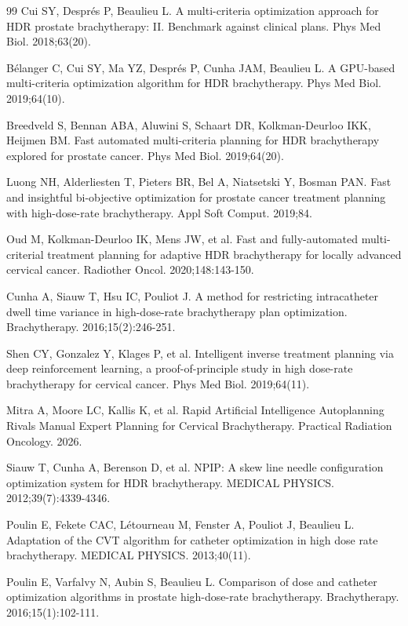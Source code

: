 \documentclass[12pt,twoside,letterpaper]{article}
\newcounter{algorithm}
\begin{document}
\begin{thebibliography}{99}
 Cui SY, Després P, Beaulieu L. A multi-criteria optimization approach for HDR prostate brachytherapy: II. Benchmark against clinical plans. Phys Med Biol. 2018;63(20).

 Bélanger C, Cui SY, Ma YZ, Després P, Cunha JAM, Beaulieu L. A GPU-based multi-criteria optimization algorithm for HDR brachytherapy. Phys Med Biol. 2019;64(10).

 Breedveld S, Bennan ABA, Aluwini S, Schaart DR, Kolkman-Deurloo IKK, Heijmen BM. Fast automated multi-criteria planning for HDR brachytherapy explored for prostate cancer. Phys Med Biol. 2019;64(20).

 Luong NH, Alderliesten T, Pieters BR, Bel A, Niatsetski Y, Bosman PAN. Fast and insightful bi-objective optimization for prostate cancer treatment planning with high-dose-rate brachytherapy. Appl Soft Comput. 2019;84.

 Oud M, Kolkman-Deurloo IK, Mens JW, et al. Fast and fully-automated multi-criterial treatment planning for adaptive HDR brachytherapy for locally advanced cervical cancer. Radiother Oncol. 2020;148:143-150.

 Cunha A, Siauw T, Hsu IC, Pouliot J. A method for restricting intracatheter dwell time variance in high-dose-rate brachytherapy plan optimization. Brachytherapy. 2016;15(2):246-251.

 Shen CY, Gonzalez Y, Klages P, et al. Intelligent inverse treatment planning via deep reinforcement learning, a proof-of-principle study in high dose-rate brachytherapy for cervical cancer. Phys Med Biol. 2019;64(11).

 Mitra A, Moore LC, Kallis K, et al. Rapid Artificial Intelligence Autoplanning Rivals Manual Expert Planning for Cervical Brachytherapy. Practical Radiation Oncology. 2026.

 Siauw T, Cunha A, Berenson D, et al. NPIP: A skew line needle configuration optimization system for HDR brachytherapy. MEDICAL PHYSICS. 2012;39(7):4339-4346.

 Poulin E, Fekete CAC, Létourneau M, Fenster A, Pouliot J, Beaulieu L. Adaptation of the CVT algorithm for catheter optimization in high dose rate brachytherapy. MEDICAL PHYSICS. 2013;40(11).

 Poulin E, Varfalvy N, Aubin S, Beaulieu L. Comparison of dose and catheter optimization algorithms in prostate high-dose-rate brachytherapy. Brachytherapy. 2016;15(1):102-111.


\end{thebibliography}
\end{document}
